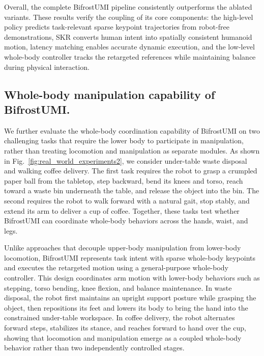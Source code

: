 \documentclass[letterpaper, 10 pt, conference]{ieeeconf}  %
\begin{document}
Overall, the complete BifrostUMI pipeline consistently outperforms the ablated variants. These results verify the coupling of its core components: the high-level policy predicts task-relevant sparse keypoint trajectories from robot-free demonstrations, SKR converts human intent into spatially consistent humanoid motion, latency matching enables accurate dynamic execution, and the low-level whole-body controller tracks the retargeted references while maintaining balance during physical interaction.


\subsection{Whole-body manipulation capability of BifrostUMI.}



\label{sec:exp_whole_body_coordination}

We further evaluate the whole-body coordination capability of BifrostUMI on two challenging tasks that require the lower body to participate in manipulation, rather than treating locomotion and manipulation as separate modules. As shown in Fig.~\ref{fig:real_world_experiments2}, we consider under-table waste disposal and walking coffee delivery. The first task requires the robot to grasp a crumpled paper ball from the tabletop, step backward, bend its knees and torso, reach toward a waste bin underneath the table, and release the object into the bin. The second requires the robot to walk forward with a natural gait, stop stably, and extend its arm to deliver a cup of coffee. Together, these tasks test whether BifrostUMI can coordinate whole-body behaviors across the hands, waist, and legs.

Unlike approaches that decouple upper-body manipulation from lower-body locomotion, BifrostUMI represents task intent with sparse whole-body keypoints and executes the retargeted motion using a general-purpose whole-body controller. This design coordinates arm motion with lower-body behaviors such as stepping, torso bending, knee flexion, and balance maintenance. In waste disposal, the robot first maintains an upright support posture while grasping the object, then repositions its feet and lowers its body to bring the hand into the constrained under-table workspace. In coffee delivery, the robot alternates forward steps, stabilizes its stance, and reaches forward to hand over the cup, showing that locomotion and manipulation emerge as a coupled whole-body behavior rather than two independently controlled stages.
\end{document}

